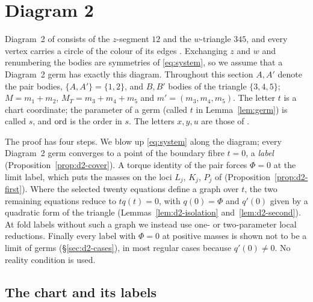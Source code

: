 \section{Diagram 2}\label{sec:d2}

Diagram~2 of \cite[Fig.~11]{AK} consists of the $z$-segment $12$ and the $w$-triangle $345$,
and every vertex carries a circle of the colour of its edges \cite[\S8.2, p.~572]{AK}.
Exchanging $z$ and $w$ and renumbering the bodies are symmetries of \eqref{eq:system}, so we
assume that a Diagram~2 germ has exactly this diagram.
Throughout this section $A,A'$ denote the pair bodies, $\{A,A'\}=\{1,2\}$, and $B,B'$ bodies of
the triangle $\{3,4,5\}$; $M=m_1+m_2$, $M_T=m_3+m_4+m_5$ and $m'=(m_3,m_4,m_5)$.  The letter $t$
is a chart coordinate; the parameter of a germ (called $t$ in Lemma~\ref{lem:germ}) is called
$s$, and $\operatorname{ord}$ is the order in $s$.  The letters $x,y,u$ are those of \cite[\S8.2]{AK}.

The proof has four steps.  We blow up \eqref{eq:system} along the diagram; every Diagram~2 germ
converges to a point of the boundary fibre $t=0$, a \emph{label}
(Proposition~\ref{prop:d2-cover}).  A torque identity of the pair forces $\Phi=0$ at the limit
label, which puts the masses on the loci $L_j$, $K_j$, $P_j$ of \cite[\S8.2]{AK}
(Proposition~\ref{prop:d2-first}).  Where the selected twenty equations define a graph over
$t$, the two remaining equations reduce to $tq(t)=0$, with $q(0)=\Phi$ and $q'(0)$ given by a
quadratic form of the triangle (Lemmas~\ref{lem:d2-isolation} and~\ref{lem:d2-second}).  At
fold labels without such a graph we instead use one- or two-parameter local reductions.
Finally every label with $\Phi=0$ at positive masses is shown not to be a limit of germs
(\S\ref{sec:d2-cases}), in most regular cases because $q'(0)\ne0$.  No reality condition is used.

\subsection{The chart and its labels}\label{sec:d2-chart}

